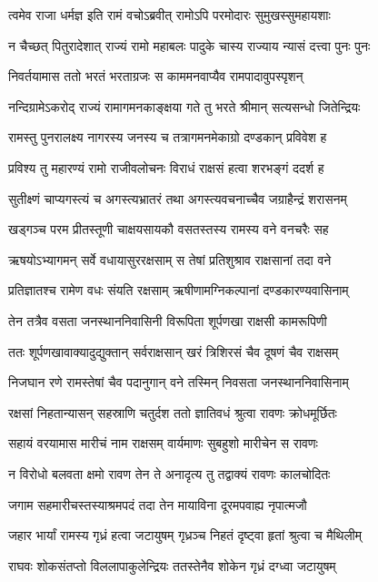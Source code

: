 \twolineshloka
{त्वमेव राजा धर्मज्ञ इति रामं वचोऽब्रवीत्}
{रामोऽपि परमोदारः सुमुखस्सुमहायशाः} %

\twolineshloka
{न चैच्छत् पितुरादेशात् राज्यं रामो महाबलः}
{पादुके चास्य राज्याय न्यासं दत्त्वा पुनः पुनः} %

\twolineshloka
{निवर्तयामास ततो भरतं भरताग्रजः}
{स काममनवाप्यैव रामपादावुपस्पृशन्} %

\twolineshloka
{नन्दिग्रामेऽकरोद् राज्यं रामागमनकाङ्क्षया}
{गते तु भरते श्रीमान् सत्यसन्धो जितेन्द्रियः} %

\twolineshloka
{रामस्तु पुनरालक्ष्य नागरस्य जनस्य च}
{तत्रागमनमेकाग्रो दण्डकान् प्रविवेश ह} %

\twolineshloka
{प्रविश्य तु महारण्यं रामो राजीवलोचनः}
{विराधं राक्षसं हत्वा शरभङ्गं ददर्श ह} %

\twolineshloka
{सुतीक्ष्णं चाप्यगस्त्यं च अगस्त्यभ्रातरं तथा}
{अगस्त्यवचनाच्चैव जग्राहैन्द्रं शरासनम्} %

\twolineshloka
{खड्गञ्च परम प्रीतस्तूणी चाक्षयसायकौ}
{वसतस्तस्य रामस्य वने वनचरैः सह} %

\twolineshloka
{ऋषयोऽभ्यागमन् सर्वे वधायासुररक्षसाम्}
{स तेषां प्रतिशुश्राव राक्षसानां तदा वने} %

\twolineshloka
{प्रतिज्ञातश्च रामेण वधः संयति रक्षसाम्}
{ऋषीणामग्निकल्पानां दण्डकारण्यवासिनाम्} %

\twolineshloka
{तेन तत्रैव वसता जनस्थाननिवासिनी}
{विरूपिता शूर्पणखा राक्षसी कामरूपिणी} %

\twolineshloka
{ततः शूर्पणखावाक्यादुद्युक्तान् सर्वराक्षसान्}
{खरं त्रिशिरसं चैव दूषणं चैव राक्षसम्} %

\twolineshloka
{निजघान रणे रामस्तेषां चैव पदानुगान्}
{वने तस्मिन् निवसता जनस्थाननिवासिनाम्} %

\twolineshloka
{रक्षसां निहतान्यासन् सहस्राणि चतुर्दश}
{ततो ज्ञातिवधं श्रुत्वा रावणः क्रोधमूर्छितः} %

\twolineshloka
{सहायं वरयामास मारीचं नाम राक्षसम्}
{वार्यमाणः सुबहुशो मारीचेन स रावणः} %

\twolineshloka
{न विरोधो बलवता क्षमो रावण तेन ते}
{अनादृत्य तु तद्वाक्यं रावणः कालचोदितः} %

\twolineshloka
{जगाम सहमारीचस्तस्याश्रमपदं तदा}
{तेन मायाविना दूरमपवाह्य नृपात्मजौ} %

\twolineshloka
{जहार भार्यां रामस्य गृध्रं हत्वा जटायुषम्}
{गृध्रञ्च निहतं दृष्ट्वा हृतां श्रुत्वा च मैथिलीम्} %

\twolineshloka
{राघवः शोकसंतप्तो विललापाकुलेन्द्रियः}
{ततस्तेनैव शोकेन गृध्रं दग्ध्वा जटायुषम्} %

